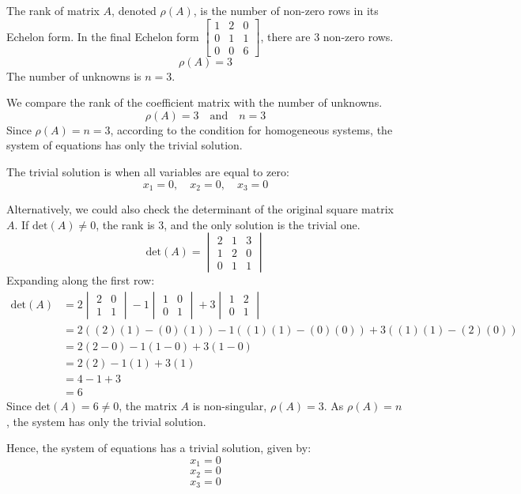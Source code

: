 \documentclass{article}
\begin{document}
The rank of matrix $A$, denoted $\rho(A)$, is the number of non-zero rows in its Echelon form. In the final Echelon form $\begin{bmatrix} 1 & 2 & 0 \\ 0 & 1 & 1 \\ 0 & 0 & 6 \end{bmatrix}$, there are 3 non-zero rows.
\[ \rho(A) = 3 \]
The number of unknowns is $n=3$.

We compare the rank of the coefficient matrix with the number of unknowns.
\[ \rho(A) = 3 \quad \text{and} \quad n = 3 \]
Since $\rho(A) = n = 3$, according to the condition for homogeneous systems, the system of equations has only the trivial solution.

The trivial solution is when all variables are equal to zero:
\[ x_1 = 0, \quad x_2 = 0, \quad x_3 = 0 \]

Alternatively, we could also check the determinant of the original square matrix $A$. If $\text{det}(A) \neq 0$, the rank is 3, and the only solution is the trivial one.
\[ \text{det}(A) = \begin{vmatrix} 2 & 1 & 3 \\ 1 & 2 & 0 \\ 0 & 1 & 1 \end{vmatrix} \]
Expanding along the first row:
\begin{align*} \text{det}(A) &= 2 \begin{vmatrix} 2 & 0 \\ 1 & 1 \end{vmatrix} - 1 \begin{vmatrix} 1 & 0 \\ 0 & 1 \end{vmatrix} + 3 \begin{vmatrix} 1 & 2 \\ 0 & 1 \end{vmatrix} \\ &= 2((2)(1) - (0)(1)) - 1((1)(1) - (0)(0)) + 3((1)(1) - (2)(0)) \\ &= 2(2 - 0) - 1(1 - 0) + 3(1 - 0) \\ &= 2(2) - 1(1) + 3(1) \\ &= 4 - 1 + 3 \\ &= 6 \end{align*}
Since $\text{det}(A) = 6 \neq 0$, the matrix $A$ is non-singular, $\rho(A) = 3$. As $\rho(A) = n$, the system has only the trivial solution.

Hence, the system of equations has a trivial solution, given by:
\[ x_1 = 0 \]
\[ x_2 = 0 \]
\[ x_3 = 0 \]
\end{document}
